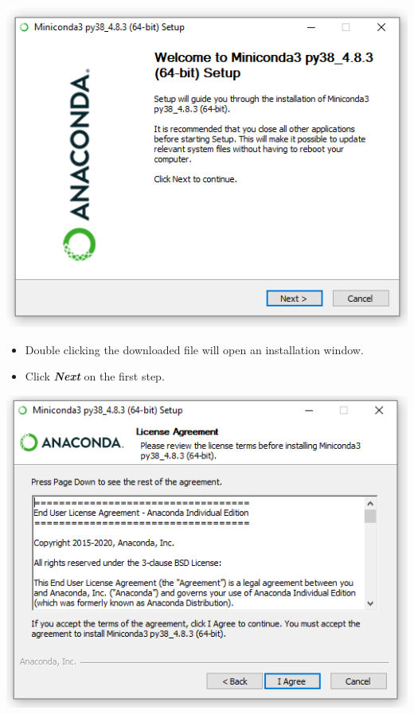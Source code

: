 \documentclass[
]{book}
\providecommand{\tightlist}{%
  \setlength{\itemsep}{0pt}\setlength{\parskip}{0pt}}
\begin{document}
\begin{center}\includegraphics[width=7.22in]{figs/chp4/Inst_1} \end{center}

\begin{itemize}
\tightlist
\item
  Double clicking the downloaded file will open an installation window.
\item
  Click \textbf{\emph{Next}} on the first step.
\end{itemize}

\begin{center}\includegraphics[width=7.24in]{figs/chp4/Inst_2} \end{center}
\end{document}
